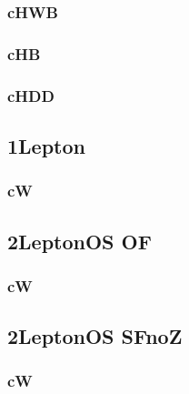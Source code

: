 \documentclass[landscape, 12pt,letterpaper]{article}
\begin{document}
\newpage

\subsubsection{cHWB}


\newpage

\subsubsection{cHB}


\newpage

\subsubsection{cHDD}


\newpage

\newpage

\subsection{1Lepton }
\subsubsection{cW}


\newpage

\newpage

\subsection{2LeptonOS OF}
\subsubsection{cW}


\newpage

\newpage

\subsection{2LeptonOS SFnoZ}
\subsubsection{cW}

\end{document}
